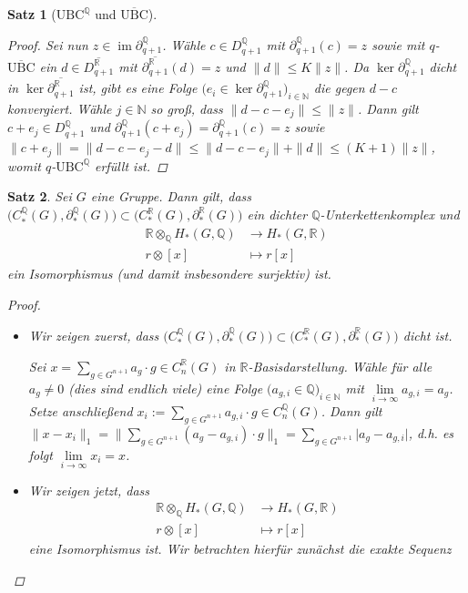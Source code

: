 \documentclass[a4paper,twoside,10pt]{scrreprt}
\DeclareMathOperator{\img}{im}
\newcommand{\UBC}{\text{UBC}}
\newcommand{\N}{\mathbb{N}}
\newcommand{\Q}{\mathbb{Q}}
\newcommand{\R}{\mathbb{R}}
\newtheorem{satz}{Satz}[section]
\theoremstyle{definition}
\begin{document}
\begin{satz}[$\UBC^{\Q}$ und $\overline{\UBC}$]
\begin{proof}
Sei nun $z\in \img \partial_{q+1}^{\Q}$. Wähle $c\in D_{q+1}^{\Q}$ mit $\partial_{q+1}^{\Q}(c)=z$ sowie mit $q$-$\overline{\UBC}$ ein $d\in \overline{D_{q+1}^{\R}}$ mit $\overline{\partial_{q+1}^{\R}}(d)=z$ und $\|d\|\leq K\|z\|$. Da $\ker \partial_{q+1}^{\Q}$ dicht in $\ker \overline{\partial_{q+1}^{\R}}$ ist, gibt es eine Folge $\bigl(e_i\in \ker \partial_{q+1}^{\Q}\bigr)_{i\in\N}$ die gegen $d-c$ konvergiert. Wähle $j\in \N$ so groß, dass $\|d-c-e_j\|\leq \|z\|$. Dann gilt $c+e_j\in D_{q+1}^{\Q}$ und $\partial_{q+1}^{\Q}(c+e_j)=\partial_{q+1}^{\Q}(c)=z$ sowie $\|c+e_j\|=\|d-c-e_j-d\|\leq \|d-c-e_j\|+\|d\|\leq (K+1)\|z\|$, womit $q$-$\UBC^{\Q}$ erfüllt ist.
\end{proof}
\end{satz}

\begin{satz}\label{satz:QFulfillsConditions}
Sei $G$ eine Gruppe.
Dann gilt, dass $\bigl(C_*^{\Q}(G),\partial_*^{\Q}(G)\bigr)\subset (C_*^{\R}(G),\partial_*^{\R}(G)\bigr)$ ein dichter $\Q$-Unterkettenkomplex und
\begin{align*}
\R\otimes_{\Q}H_*(G,\Q)&\to H_*(G,\R)\\
r\otimes [x] &\mapsto r[x]
\end{align*}
ein Isomorphismus (und damit insbesondere surjektiv) ist.
\begin{proof}\hfill
\begin{itemize}
\item Wir zeigen zuerst, dass $\bigl(C_*^{\Q}(G),\partial_*^{\Q}(G)\bigr)\subset (C_*^{\R}(G),\partial_*^{\R}(G)\bigr)$ dicht ist.\par
Sei $x=\sum\limits_{g\in G^{n+1}} a_g\cdot g\in C_n^{\R}(G)$ in $\R$-Basisdarstellung. Wähle für alle $a_g\neq 0$ (dies sind endlich viele) eine Folge $\bigl(a_{g,i}\in \Q\bigr)_{i\in\N}$ mit $\lim\limits_{i\to \infty}a_{g,i}=a_g$. Setze anschließend $x_i:=\sum\limits_{g\in G^{n+1}}a_{g,i}\cdot g\in C_n^{\Q}(G)$. Dann gilt $\|x-x_i\|_1=\biggl\|\sum\limits_{g\in G^{n+1}}(a_g-a_{g,i})\cdot g\biggr\|_1=\sum\limits_{g\in G^{n+1}}\lvert a_g-a_{g,i}\rvert$, d.h. es folgt $\lim\limits_{i\to\infty}x_i=x$.
\item Wir zeigen jetzt, dass 
\begin{align*}
\R\otimes_{\Q}H_*(G,\Q)&\to H_*(G,\R)\\
r\otimes [x] &\mapsto r[x]
\end{align*} 
eine Isomorphismus ist. Wir betrachten hierfür zunächst die exakte Sequenz
\begin{center}
\begin{tikzpicture}

\end{tikzpicture}
\end{center}
\end{itemize}
\end{proof}
\end{satz}
\end{document}
